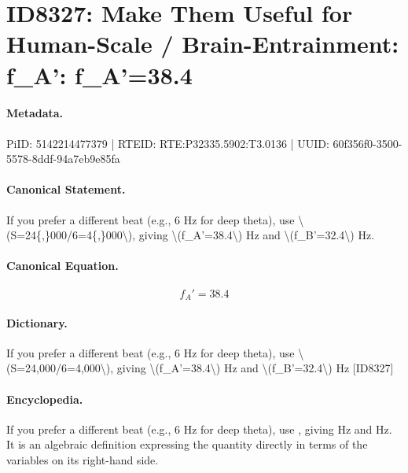\section*{ID8327: Make Them Useful for Human-Scale / Brain-Entrainment: f\_A': f\_A'=38.4}
\paragraph{Metadata.}
PiID: 5142214477379 | RTEID: RTE:P32335.5902:T3.0136 | UUID: 60f356f0-3500-5578-8ddf-94a7eb9e85fa

\paragraph{Canonical Statement.}
If you prefer a different beat (e.g., 6 Hz for deep theta), use \textbackslash{}(S=24\{,\}000/6=4\{,\}000\textbackslash{}), giving \textbackslash{}(f\_A'=38.4\textbackslash{}) Hz and \textbackslash{}(f\_B'=32.4\textbackslash{}) Hz.

\paragraph{Canonical Equation.}
\[
f_A'=38.4
\]

\paragraph{Dictionary.}
If you prefer a different beat (e.g., 6 Hz for deep theta), use \textbackslash{}(S=24,000/6=4,000\textbackslash{}), giving \textbackslash{}(f\_A'=38.4\textbackslash{}) Hz and \textbackslash{}(f\_B'=32.4\textbackslash{}) Hz [ID8327]

\paragraph{Encyclopedia.}
If you prefer a different beat (e.g., 6 Hz for deep theta), use , giving Hz and Hz. It is an algebraic definition expressing the quantity directly in terms of the variables on its right-hand side.

